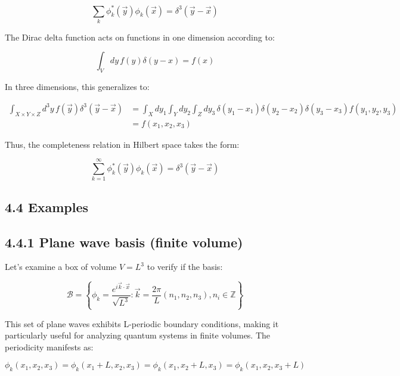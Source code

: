 \documentclass[italian]{HKNdocument}
\begin{document}
\begin{equation*}
\sum_k \phi_k^*(\vec{y})\phi_k(\vec{x}) = \delta^3(\vec{y}-\vec{x}) \tag{4.30}
\end{equation*}

The Dirac delta function acts on functions in one dimension according to:

\begin{equation*}
\int_V dy\, f(y)\delta(y-x) = f(x) \tag{4.31}
\end{equation*}

In three dimensions, this generalizes to:

\begin{align*}
\int_{X \times Y \times Z} d^3y\, f(\vec{y})\delta^3(\vec{y}-\vec{x}) &= \int_X dy_1 \int_Y dy_2 \int_Z dy_3\, \delta(y_1-x_1)\delta(y_2-x_2)\delta(y_3-x_3)f(y_1,y_2,y_3) \\
&= f(x_1,x_2,x_3) \tag{4.32}
\end{align*}

Thus, the completeness relation in Hilbert space takes the form:

\begin{equation*}
\sum_{k=1}^{\infty} \phi_k^*(\vec{y})\phi_k(\vec{x}) = \delta^3(\vec{y}-\vec{x}) \tag{4.33}
\end{equation*}

\subsection*{4.4 Examples}
\subsection*{4.4.1 Plane wave basis (finite volume)}
Let's examine a box of volume $V = L^3$ to verify if the basis:


\begin{equation*}
\mathcal{B} = \left\{\phi_k = \frac{e^{i\vec{k}\cdot\vec{x}}}{\sqrt{L^3}}: \vec{k} = \frac{2\pi}{L}(n_1, n_2, n_3), n_i \in \mathbb{Z}\right\} \tag{4.34}
\end{equation*}

This set of plane waves exhibits L-periodic boundary conditions, making it particularly useful for analyzing quantum systems in finite volumes. The periodicity manifests as:

\begin{equation*}
\phi_k(x_1, x_2, x_3) = \phi_k(x_1+L, x_2, x_3) = \phi_k(x_1, x_2+L, x_3) = \phi_k(x_1, x_2, x_3+L) \tag{4.35}
\end{equation*}
\end{document}
